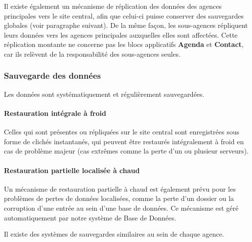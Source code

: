 Il existe également un mécanisme de réplication des données des agences principales vers le site central,
afin que celui-ci puisse conserver des sauvegardes globales (voir paragraphe suivant). De la même façon,
les sous-agences répliquent leurs données vers les agences principales auxquelles elles sont affectées.
Cette réplication montante ne concerne pas les blocs applicatifs \textbf{Agenda} et \textbf{Contact}, car
ils relèvent de la responsabilité des sous-agences seules.

\subsubsection{Sauvegarde des données}

Les données sont systématiquement et régulièrement sauvegardées.

\paragraph{Restauration intégrale à froid}

Celles qui sont présentes ou répliquées
sur le site central sont enregistrées sous forme de clichés instantanés, qui peuvent être restaurés
intégralement à froid en cas de problème majeur (cas extrêmes comme la perte d'un ou plusieur serveurs).

\paragraph{Restauration partielle localisée à chaud}

Un mécanisme de restauration partielle à chaud est également prévu pour
les problèmes de pertes de données localisées, comme la perte d'un dossier ou la corruption d'une entrée
au sein d'une base de données. Ce mécanisme est géré automatiquement par notre système de Base de Données.

Il existe des systèmes de sauvegardes similaires au sein de chaque agence.
